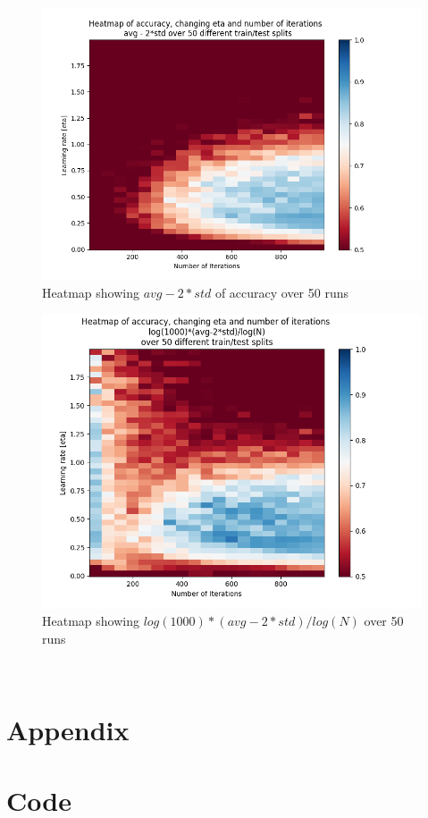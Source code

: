 \documentclass{article}
\begin{document}
\begin{figure}[H]
    \centering
    \includegraphics[width=\textwidth]{05_backprop/indep50avgstd.png}
    \caption{Heatmap showing \(avg - 2*std\) of accuracy over 50 runs}
    \label{fig:indep50avgstd}
\end{figure}
\begin{figure}[H]
    \centering
    \includegraphics[width=\textwidth]{05_backprop/indep50log.png}
    \caption{Heatmap showing \(log(1000)*(avg-2*std)/log(N)\) over 50 runs}
    \label{fig:indep50log}
\end{figure}
\\

\newpage
\section*{Appendix}
\appendix
\section{Code}


\end{document}
